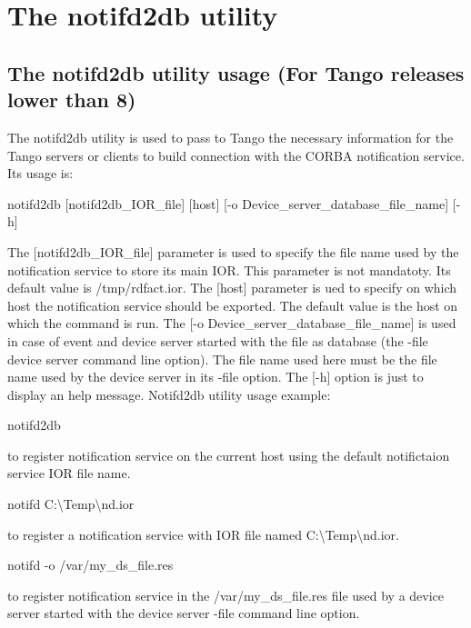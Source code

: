 
\chapter{The notifd2db utility}


\section{The notifd2db utility usage (For Tango releases lower than 8)}

The notifd2db utility is used to pass to Tango the necessary information
for the Tango servers or clients to build connection with the CORBA
notification service. Its usage is:\begin{center}notifd2db {[}notifd2db\_IOR\_file{]}
{[}host{]} {[}-o Device\_server\_database\_file\_name{]} {[}-h{]}\end{center}



The {[}notifd2db\_IOR\_file{]} parameter is used to specify the file
name used by the notification service to store its main IOR. This
parameter is not mandatoty. Its default value is /tmp/rdfact.ior.
The {[}host{]} parameter is ued to specify on which host the notification
service should be exported. The default value is the host on which
the command is run. The {[}-o Device\_server\_database\_file\_name{]}
is used in case of event and device server started with the file as
database (the -file device server command line option). The file name
used here must be the file name used by the device server in its -file
option. The {[}-h{]} option is just to display an help message. Notifd2db
utility usage example:\begin{center}notifd2db\end{center} to register
notification service on the current host using the default notifictaion
service IOR file name. \begin{center}notifd C:\textbackslash{}Temp\textbackslash{}nd.ior\end{center}
to register a notification service with IOR file named C:\textbackslash{}Temp\textbackslash{}nd.ior.\begin{center}

notifd -o /var/my\_ds\_file.res\end{center} to register notification
service in the /var/my\_ds\_file.res file used by a device server
started with the device server -file command line option.
